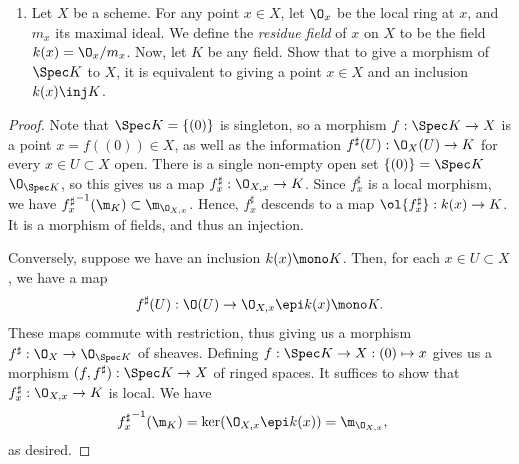 \documentclass[12pt]{amsart}
\newcommand{\vepsilon}{\varepsilon}
\begin{document}
\begin{enumerate}
	\item[2.7.] {
      Let $X$ be a scheme.
      For any point $x\in X$, let $\O_x$ be the local ring at $x$, and $m_x$ its maximal ideal.
      We define the \emph{residue field} of $x$ on $X$ to be the field $k(x)=\O_x/m_x$.
      Now, let $K$ be any field.
      Show that to give a morphism of $\Spec K$ to $X$, it is equivalent to giving a point $x\in X$ and an inclusion $k(x)\inj K$.
    }
\end{enumerate}

\begin{proof}
  Note that $\Spec K=\{(0)\}$ is singleton, so a morphism $f:\Spec K\to X$ is a point $x=f((0))\in X$, as well as the information $f^\sharp(U): \O_X(U)\to K$ for every $x\in U\subset X$ open.
  There is a single non-empty open set $\{(0)\}=\Spec K$ $\O_{\Spec K}$, so this gives us a map $f^\sharp_x:\O_{X,x}\to K$.
  Since $f^\sharp_x$ is a local morphism, we have ${f^\sharp_x}^{-1}(\m_K)\subset\m_{\O_{X,x}}$.
  Hence, $f^\sharp_x$ descends to a map $\ol{f^\sharp_x}:k(x)\to K$.
  It is a morphism of fields, and thus an injection.

  Conversely, suppose we have an inclusion $k(x)\mono K$.
  Then, for each $x\in U\subset X$, we have a map 
  \[
    f^\sharp(U):\O(U)\to \O_{X,x}\epi k(x)\mono K.
  \]
  These maps commute with restriction, thus giving us a morphism $f^\sharp:\O_X\to \O_{\Spec K}$ of sheaves.
  Defining $f:\Spec K\to X:(0)\mapsto x$ gives us a morphism $(f,f^\sharp):\Spec K\to X$ of ringed spaces.
  It suffices to show that $f^\sharp_x:\O_{X,x}\to K$ is local.
  We have 
  \begin{align*}
    {f^\sharp_x}^{-1}(\m_K)
    &= \ker(\O_{X,x} \epi k(x))
    = \m_{\O_{X,x}},
  \end{align*}
  as desired.
\end{proof}

% 
\end{document}
